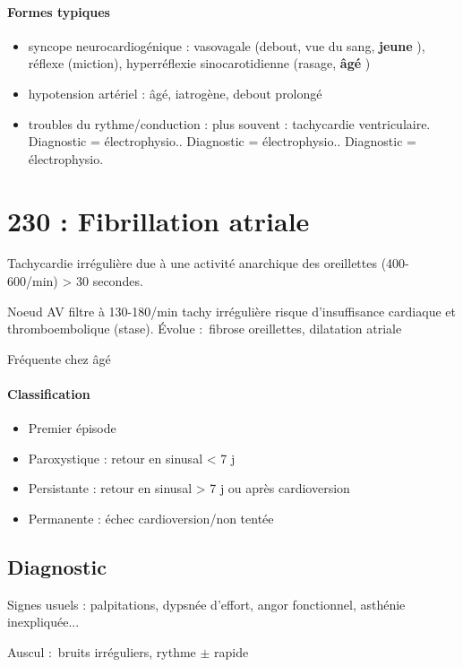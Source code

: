 \paragraph{Formes typiques}
\begin{itemize}
  \item syncope neurocardiogénique : vasovagale (debout, vue du sang,
    \textbf{jeune} ), réflexe
    (miction), hyperréflexie sinocarotidienne (rasage, \textbf{âgé} )
  \item hypotension artériel : âgé, iatrogène, debout prolongé
  \item troubles du rythme/conduction : plus souvent : tachycardie
    ventriculaire. Diagnostic = électrophysio.. Diagnostic = électrophysio..
    Diagnostic = électrophysio.
\end{itemize}

\section{230 : Fibrillation atriale}%
\label{sec:230_fibrillation_atriale}

Tachycardie irrégulière due à une activité anarchique des oreillettes
(400-600/min) > 30 secondes.

Noeud AV filtre à 130-180/min \thus tachy irrégulière \thus risque
d'insuffisance cardiaque et thromboembolique (stase). Évolue : fibrose
oreillettes, dilatation atriale

Fréquente chez âgé

\paragraph{Classification}
\begin{itemize}
  \item Premier épisode
  \item Paroxystique : retour en sinusal < 7 j
  \item Persistante :  retour en sinusal > 7 j ou après cardioversion
  \item Permanente : échec cardioversion/non tentée
\end{itemize}

\subsection{Diagnostic}
Signes usuels : palpitations, dypsnée d'effort, angor fonctionnel, asthénie
inexpliquée...

Auscul : bruits irréguliers, rythme $\pm$ rapide

